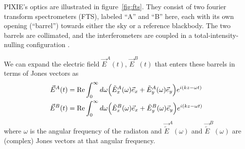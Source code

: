 \documentclass{article}
\renewcommand{\Re}{\operatorname{Re}}
\newcommand{\J}{{\tilde E}}
\begin{document}
PIXIE's optics are illustrated in figure~\ref{fig:fts}. They consist
of two fourier transform spectrometers (FTS), labeled ``A'' and ``B'' here,
each with its own opening (``barrel'') towards either the sky or a reference
blackbody. The two barrels are collimated, and the interferometers are coupled
in a total-intensity-nulling configuration \citep{pixie2011}.

We can expand the electric field $\vec E^A(t)$,
$\vec E^B(t)$ that enters these barrels in terms of Jones vectors as
\begin{align}
	\vec E^A(t) &= \Re \int_0^\infty d\omega \Big(\J^A_x(\omega)\vec e_x +
		\J^A_y(\omega)\vec e_y\Big) e^{i(kz-\omega t)} \notag \\
	\vec E^B(t) &= \Re \int_0^\infty d\omega \Big(\J^B_x(\omega)\vec e_x +
		\J^B_y(\omega)\vec e_y\Big) e^{i(kz-\omega t)}
\end{align}
where $\omega$ is the angular frequency of the radiaton and $\vec \J^A(\omega)$
and $\vec \J^B(\omega)$ are (complex) Jones vectors at that
angular frequency.
\end{document}
